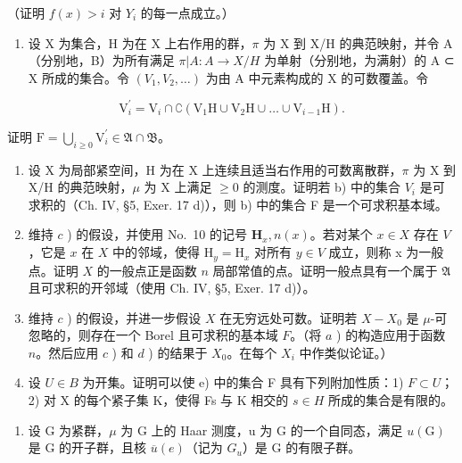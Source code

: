 （证明 \(f(x) > i\) 对 \(Y_i\) 的每一点成立。）

\begin{enumerate}
\def\labelenumi{\alph{enumi})}
\setcounter{enumi}{1}
\tightlist
\item
  设 X 为集合，H 为在 X 上右作用的群，\(\pi\) 为 X 到 X/H 的典范映射，并令 A（分别地，B）为所有满足 \(\pi|A:A\to X/H\) 为单射（分别地，为满射）的 A ⊂ X 所成的集合。令 \((V_{1},V_{2},\ldots)\) 为由 A 中元素构成的 X 的可数覆盖。令
\end{enumerate}

\[
\mathrm{V} _ {i} ^ {\prime} = \mathrm{V} _ {i} \cap \complement \left(\mathrm{V} _ {1} \mathrm{H} \cup \mathrm{V} _ {2} \mathrm{H} \cup \dots \cup \mathrm{V} _ {i - 1} \mathrm{H}\right).
\]

证明 \(\mathrm{F} = \bigcup_{i\geqslant 0}\mathrm{V}_i^\prime \in \mathfrak{A}\cap \mathfrak{B}\)。

\begin{enumerate}
\def\labelenumi{\alph{enumi})}
\setcounter{enumi}{2}
\item
  设 X 为局部紧空间，H 为在 X 上连续且适当右作用的可数离散群，\(\pi\) 为 X 到 X/H 的典范映射，\(\mu\) 为 X 上满足 \(\geqslant 0\) 的测度。证明若 b) 中的集合 \(V_{i}\) 是可求积的（Ch. IV, §5, Exer. 17 d)），则 b) 中的集合 F 是一个可求积基本域。
\item
  维持 \(c\) ) 的假设，并使用 No.~10 的记号 \(\mathbf{H}_x, n(x)\)。若对某个 \(x \in X\) 存在 \(V\)，它是 \(x\) 在 \(X\) 中的邻域，使得 \(\mathrm{H}_y = \mathrm{H}_x\) 对所有 \(y \in V\) 成立，则称 x 为一般点。证明 \(X\) 的一般点正是函数 \(n\) 局部常值的点。证明一般点具有一个属于 \(\mathfrak{A}\) 且可求积的开邻域（使用 Ch. IV, §5, Exer. 17 d)）。
\item
  维持 \(c\) ) 的假设，并进一步假设 \(X\) 在无穷远处可数。证明若 \(X - X_0\) 是 \(\mu\)-可忽略的，则存在一个 Borel 且可求积的基本域 \(F\)。（将 \(a\) ) 的构造应用于函数 \(n\)。然后应用 \(c\) ) 和 \(d\) ) 的结果于 \(X_0\)。在每个 \(X_i\) 中作类似论证。）
\item
  设 \(U \in B\) 为开集。证明可以使 e) 中的集合 F 具有下列附加性质：1) \(F \subset U\)；2) 对 X 的每个紧子集 K，使得 Fs 与 K 相交的 \(s \in H\) 所成的集合是有限的。
\end{enumerate}

\begin{enumerate}
\def\labelenumi{\arabic{enumi})}
\setcounter{enumi}{12}
\tightlist
\item
  设 G 为紧群，\(\mu\) 为 G 上的 Haar 测度，u 为 G 的一个自同态，满足 \(u(\mathrm{G})\) 是 G 的开子群，且核 \(\overline{u}(e)\)（记为 \(G_{u}\)）是 G 的有限子群。
\end{enumerate}

